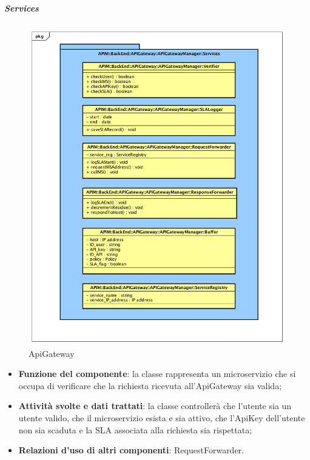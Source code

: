 \subparagraph{Services}
\begin{figure}[!htbp]
	\centering
	\includegraphics[scale=0.45]{UML/DiagrammiPackage/ApiGatewayManagerServices.png}
	\caption{ApiGateway}
\end{figure}
\FloatBarrier

\begin{itemize}
	\item \textbf{Funzione del componente}: la classe rappresenta un microservizio che si occupa di verificare che la richiesta ricevuta all'ApiGateway sia valida;
	\item \textbf{Attivit\`{a} svolte e dati trattati}: la classe controller\`{a} che l'utente sia un utente valido, che il microservizio esista e sia attivo, che l'ApiKey dell'utente non sia scaduta e la SLA associata alla richiesta sia rispettata;
	\item \textbf{Relazioni d'uso di altri componenti}: RequestForwarder.

\end{itemize}

